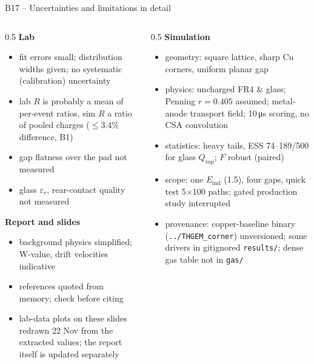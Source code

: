 \documentclass[aspectratio=169,11pt]{beamer}
\newcommand{\backlink}[1]{\hfill\hyperlink{#1}{\beamerreturnbutton{back}}}
\newcommand{\Qtop}{Q_\text{top}}
\newcommand{\Eind}{E_\text{ind}}
\newcommand{\er}{\varepsilon_r}
\begin{document}
\begin{frame}[label=b-limits]{B17 -- Uncertainties and limitations in detail}
  \footnotesize
  \begin{columns}[T]
    \begin{column}{0.5\textwidth}
      \textbf{Lab}
      \begin{itemize}
        \item fit errors small; distribution widths given; no systematic (calibration) uncertainty
        \item lab $R$ is probably a mean of per-event ratios, sim $R$ a ratio of pooled charges ($\le$3.4\% difference, B1)
        \item gap flatness over the pad not measured
        \item glass $\er$, rear-contact quality not measured
      \end{itemize}
      \textbf{Report and slides}
      \begin{itemize}
        \item background physics simplified; W-value, drift velocities indicative
        \item references quoted from memory; check before citing
        \item lab-data plots on these slides redrawn 22 Nov from the extracted values; the report itself is updated separately
      \end{itemize}
    \end{column}
    \begin{column}{0.5\textwidth}
      \textbf{Simulation}
      \begin{itemize}
        \item geometry: square lattice, sharp Cu corners, uniform planar gap
        \item physics: uncharged FR4 \& glass; Penning $r=0.405$ assumed; metal-anode transport field; 10\,\si{\micro s} scoring, no CSA convolution
        \item statistics: heavy tails, ESS 74--189/500 for glass $\Qtop$; $F$ robust (paired)
        \item scope: one $\Eind$ (1.5), four gaps, quick test 5$\times$100 paths; gated production study interrupted
        \item provenance: copper-baseline binary (\texttt{../THGEM\_corner}) unversioned; some drivers in gitignored \texttt{results/}; dense gas table not in \texttt{gas/}
      \end{itemize}
    \end{column}
  \end{columns}
  \backlink{m-limits}
\end{frame}
\end{document}
